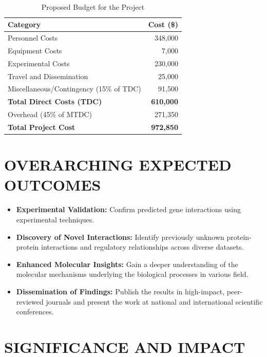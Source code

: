 \documentclass{article}
\begin{document}
\begin{table}[H]
\centering
\caption{Proposed Budget for the Project} \label{tab:budget} \\
\begin{tabular}{|p{}|r|}
\hline
\textbf{Category} & \textbf{Cost (\$)} \\ \hline
Personnel Costs & 348,000 \\ \hline
Equipment Costs & 7,000 \\ \hline
Experimental Costs & 230,000 \\ \hline
Travel and Dissemination & 25,000 \\ \hline
Miscellaneous/Contingency (15\% of TDC) & 91,500 \\ \hline
\textbf{Total Direct Costs (TDC)} & \textbf{610,000} \\ \hline
Overhead (45\% of MTDC) & 271,350 \\ \hline
\textbf{Total Project Cost} & \textbf{972,850} \\ \hline
\end{tabular}
\end{table}


\section{OVERARCHING EXPECTED OUTCOMES}

\begin{itemize}
    \item \textbf{Experimental Validation:} Confirm predicted gene interactions using experimental techniques.
    \item \textbf{Discovery of Novel Interactions:} Identify previously unknown protein-protein interactions and regulatory relationships across diverse datasets.
    \item \textbf{Enhanced Molecular Insights:} Gain a deeper understanding of the molecular mechanisms underlying the biological processes in various field.
    \item \textbf{Dissemination of Findings:} Publish the results in high-impact, peer-reviewed journals and present the work at national and international scientific conferences.
\end{itemize}

\section{SIGNIFICANCE AND IMPACT}
\end{document}
